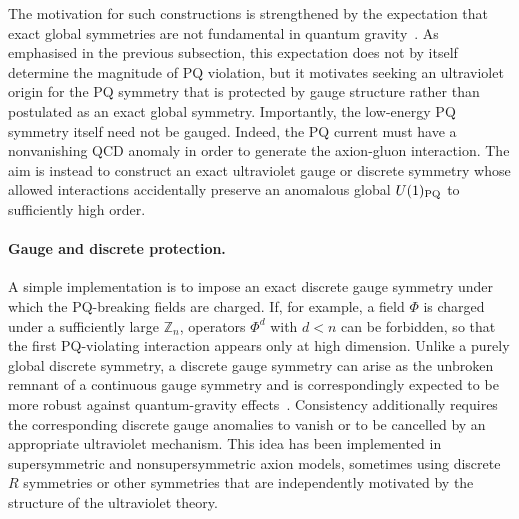 \documentclass[review]{elsarticle}
\numberwithin{equation}{section}
\numberwithin{table}{section}
\numberwithin{figure}{section}
\begin{document}
The motivation for such constructions is strengthened by the expectation that exact global symmetries are not fundamental in quantum gravity~\cite{Banks:2010zn,Harlow:2018tng}. As emphasised in the previous subsection, this expectation does not by itself determine the magnitude of PQ violation, but it motivates seeking an ultraviolet origin for the PQ symmetry that is protected by gauge structure rather than postulated as an exact global symmetry. Importantly, the low-energy PQ symmetry itself need not be gauged. Indeed, the PQ current must have a nonvanishing QCD anomaly in order to generate the axion-gluon interaction. The aim is instead to construct an exact ultraviolet gauge or discrete symmetry whose allowed interactions accidentally preserve an anomalous global $U(1)_{\rm PQ}$ to sufficiently high order.

\paragraph{Gauge and discrete protection.}

A simple implementation is to impose an exact discrete gauge symmetry under which the PQ-breaking fields are charged. If, for example, a field $\Phi$ is charged under a sufficiently large $\mathbb Z_n$, operators $\Phi^d$ with $d<n$ can be forbidden, so that the first PQ-violating interaction appears only at high dimension. Unlike a purely global discrete symmetry, a discrete gauge symmetry can arise as the unbroken remnant of a continuous gauge symmetry and is correspondingly expected to be more robust against quantum-gravity effects~\cite{Krauss:1988zc}. Consistency additionally requires the corresponding discrete gauge anomalies to vanish or to be cancelled by an appropriate ultraviolet mechanism. This idea has been implemented in supersymmetric and nonsupersymmetric axion models, sometimes using discrete $R$ symmetries or other symmetries that are independently motivated by the structure of the ultraviolet theory.
\end{document}
